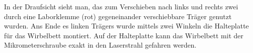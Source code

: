 In der Draufsicht sieht man, das zum Verschieben nach links und rechts zwei durch eine Laborklemme (rot) gegeneinander verschiebbare Träger genutzt wurden. Ans Ende es linken Trägers wurde mittels zwei Winkeln die Halteplatte für das Wirbelbett montiert. Auf der Halteplatte kann das Wirbelbett mit der Mikrometerschraube exakt in den Laserstrahl gefahren werden.






























